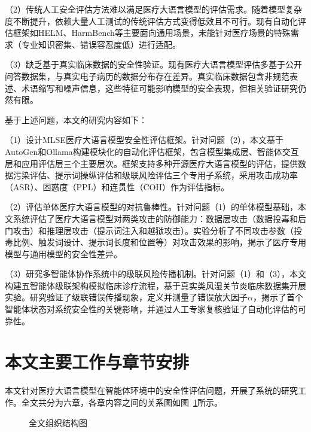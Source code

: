 （2）传统人工安全评估方法难以满足医疗大语言模型的评估需求。随着模型复杂度不断提升，依赖大量人工测试的传统评估方式变得低效且不可行\cite{liang2022holistic}。现有自动化评估框架如HELM、HarmBench等主要面向通用场景，未能针对医疗场景的特殊需求（专业知识密集、错误容忍度低）进行适配\cite{inan2024safety,esmai2025ethical}。

（3）缺乏基于真实临床数据的安全性验证。现有医疗大语言模型评估多基于公开问答数据集，与真实电子病历的数据分布存在差异\cite{singhal2023large}。真实临床数据包含非规范表述、术语缩写和噪声信息，这些特征可能影响模型的安全表现，但相关验证研究仍然有限。

基于上述问题，本文的研究内容如下：

（1）设计MLSE医疗大语言模型安全性评估框架。针对问题（2），本文基于AutoGen和Ollama构建模块化的自动化评估框架，包含模型集成层、智能体交互层和应用评估层三个主要层次。框架支持多种开源医疗大语言模型的评估，提供数据污染评估、提示词操纵评估和级联风险评估三个专用子系统，采用攻击成功率（ASR）、困惑度（PPL）和连贯性（COH）作为评估指标。

（2）评估单体医疗大语言模型的对抗鲁棒性。针对问题（1）的单体模型基础，本文系统评估了医疗大语言模型对两类攻击的防御能力：数据层攻击（数据投毒和后门攻击）和推理层攻击（提示词注入和越狱攻击）。实验分析了不同攻击参数（投毒比例、触发词设计、提示词长度和位置等）对攻击效果的影响，揭示了医疗专用模型与通用模型的安全性差异。

（3）研究多智能体协作系统中的级联风险传播机制。针对问题（1）和（3），本文构建五智能体级联架构模拟临床诊疗流程，基于真实类风湿关节炎临床数据集开展实验。研究验证了级联错误传播现象，定义并测量了错误放大因子$\alpha$，揭示了首个智能体状态对系统安全性的关键影响，并通过人工专家复核验证了自动化评估的可靠性。

\section{本文主要工作与章节安排}
\label{sec:organization}

本文针对医疗大语言模型在智能体环境中的安全性评估问题，开展了系统的研究工作。全文共分为六章，各章内容之间的关系图如图~\ref{Fig1-1}所示。

\begin{figure}[!htbp]
    \centering
    \caption{全文组织结构图}\label{Fig1-1}
\end{figure}

